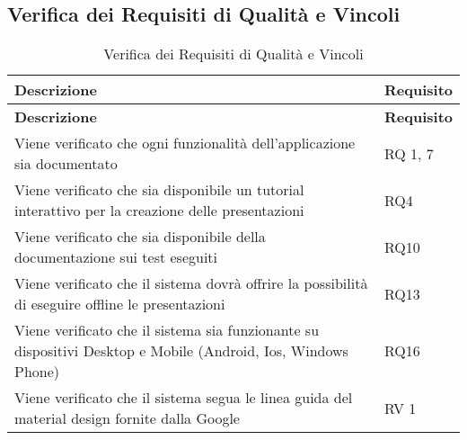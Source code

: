 {\subsection{Verifica dei Requisiti di Qualità e Vincoli}{
		\renewcommand*{\arraystretch}{1.4}
		\begin{longtable} [c]{| p{7cm} |p{4cm}|}
			\caption{Verifica dei Requisiti di Qualità e Vincoli \label{tab:verReqQualVinc}}\\
			 \hline
			 \textbf{Descrizione} & \textbf{Requisito} \\
			 \hline
			 \endfirsthead
			 \hline
			 \textbf{Descrizione} & \textbf{Requisito} \\
			 \hline
			\endhead
			 \hline
			 \endfoot
			 \hline
			 \endlastfoot
			Viene verificato che ogni funzionalità dell'applicazione sia documentato & RQ\ped{g} 1, 7\\
			\hline
			Viene verificato che sia disponibile un tutorial interattivo per la creazione delle presentazioni & RQ4\\
			\hline
			Viene verificato che sia disponibile della documentazione sui test eseguiti & RQ10\\
			\hline
			Viene verificato che il sistema dovrà offrire la possibilità di eseguire offline le presentazioni & RQ13\\
			\hline
			Viene verificato che il sistema sia funzionante su dispositivi Desktop\ped{g} e Mobile (Android\ped{g}, Ios, Windows\ped{g} Phone) & RQ16\\
			\hline
			Viene verificato che il sistema segua le linea guida del material design fornite dalla Google & RV 1\\
\end{longtable}
}
}

